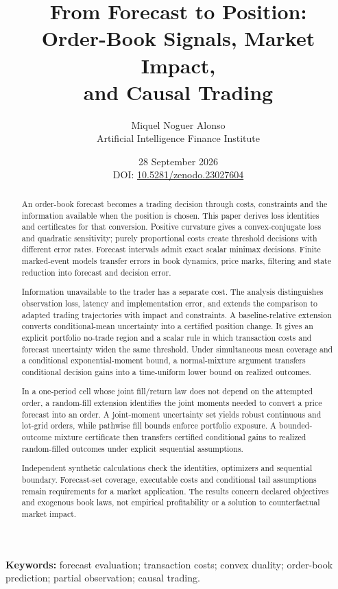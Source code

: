 \documentclass[11pt]{article}
\title{From Forecast to Position:\\
Order-Book Signals, Market Impact,\\
and Causal Trading}
\author{Miquel Noguer Alonso\\
\small Artificial Intelligence Finance Institute}
\date{28 September 2026\\[5pt]\small DOI:
\href{https://doi.org/10.5281/zenodo.23027604}{10.5281/zenodo.23027604}}
\theoremstyle{plain}
\theoremstyle{definition}
\theoremstyle{remark}
\begin{document}
\maketitle
\begin{abstract}
An order-book forecast becomes a trading decision through costs, constraints
and the information available when the position is chosen. This paper derives
loss identities and certificates for that conversion. Positive curvature
gives a convex-conjugate loss and quadratic sensitivity; purely proportional
costs create threshold decisions with different error rates. Forecast
intervals admit exact scalar minimax decisions. Finite marked-event models
transfer errors in book dynamics, price marks, filtering and state reduction
into forecast and decision error.

Information unavailable to the trader has a separate cost. The analysis
distinguishes observation loss, latency and implementation error, and extends
the comparison to adapted trading trajectories with impact and constraints.
A baseline-relative extension converts conditional-mean uncertainty into a
certified position change. It gives an explicit portfolio no-trade region
and a scalar rule in which transaction costs and forecast uncertainty widen
the same threshold. Under simultaneous mean coverage and a conditional
exponential-moment bound, a normal-mixture argument transfers conditional
decision gains into a time-uniform lower bound on realized outcomes.

In a one-period cell whose joint fill/return law does not depend on the
attempted order, a random-fill extension identifies the joint moments needed to
convert a price forecast into an order.
A joint-moment uncertainty set yields robust continuous and lot-grid orders,
while pathwise fill bounds enforce portfolio exposure. A bounded-outcome
mixture certificate then transfers certified conditional gains to realized
random-filled outcomes under explicit sequential assumptions.

Independent synthetic calculations check the identities, optimizers and
sequential boundary. Forecast-set coverage, executable costs and conditional
tail assumptions remain requirements for a market application. The results
concern declared objectives and exogenous book laws, not empirical
profitability or a solution to counterfactual market impact.
\end{abstract}
\noindent\textbf{Keywords:} forecast evaluation; transaction costs;
convex duality; order-book prediction; partial observation; causal trading.
\clearpage
\tableofcontents
\clearpage
\end{document}
